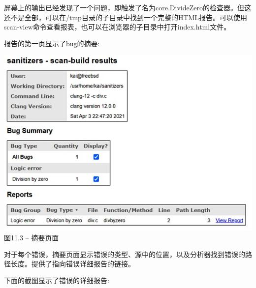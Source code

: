 屏幕上的输出已经发现了一个问题，即触发了名为core.DivideZero的检查器。但这还不是全部，可以在/tmp目录的子目录中找到一个完整的HTML报告。可以使用scan-view命令查看报表，也可以在浏览器的子目录中打开index.html文件。\par

报告的第一页显示了bug的摘要:\par

\hspace*{\fill} \par %
\begin{center}
\includegraphics[width=1\textwidth]{content/3/chapter11/images/3.jpg}\\
图11.3 – 摘要页面
\end{center}

对于每个错误，摘要页面显示错误的类型、源中的位置，以及分析器找到错误的路径长度。提供了指向错误详细报告的链接。\par

下面的截图显示了错误的详细报告:\par


